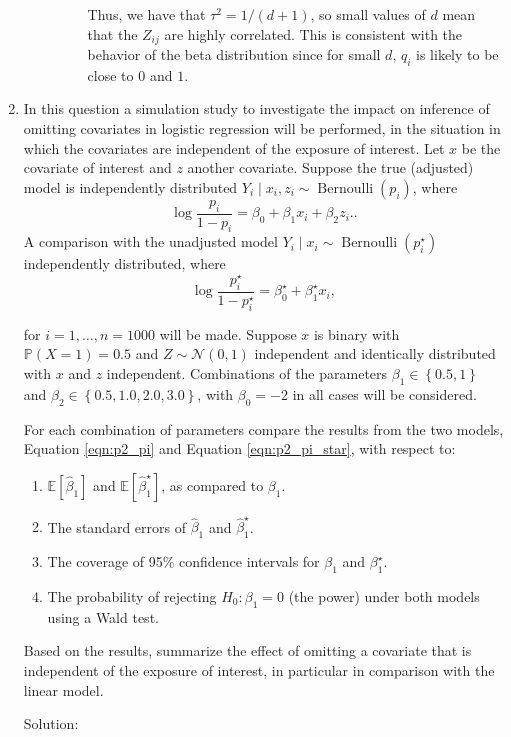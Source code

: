 \documentclass[letterpaper,11pt]{article}
\begin{document}
\begin{enumerate}
\begin{enumerate}
\begin{description}
      Thus, we have that $\tau^2 = 1/\left(d + 1\right)$, so small values of $d$
      mean that the $Z_{ij}$ are highly correlated. This is consistent with the
      behavior of the beta distribution since for small $d$, $q_i$ is likely to
      be close to $0$ and $1$.
    \end{description}
\end{enumerate}
\item In this question a simulation study to investigate the impact on inference
  of omitting covariates in logistic regression will be performed, in the
  situation in which the covariates are independent of the exposure of
  interest. Let $x$ be the covariate of interest and $z$ another
  covariate. Suppose the true (adjusted) model is independently distributed
  $Y_i \mid x_i,z_i \sim \operatorname{Bernoulli}\left(p_i\right)$, where
  \begin{equation}
    \log\frac{p_i}{1 - p_i} = \beta_0 + \beta_1x_i + \beta_2z_i.
    \label{eqn:p2_pi}.
  \end{equation}
  A comparison with the unadjusted model
  $Y_i \mid x_i \sim \operatorname{Bernoulli}\left(p_i^\star\right)$
  independently distributed, where
  \begin{equation}
    \log\frac{p_i^\star}{1 - p_i^\star} = \beta_0^\star + \beta_1^\star x_i,
    \label{eqn:p2_pi_star}
  \end{equation}

  for $i = 1,\ldots,n=1000$ will be made. Suppose $x$ is binary with
  $\mathbb{P}\left(X = 1\right) = 0.5$ and $Z \sim \mathcal{N}\left(0, 1\right)$
  independent and identically distributed with $x$ and $z$
  independent. Combinations of the parameters
  $\beta_1 \in \left\{ 0.5, 1 \right\}$ and
  $\beta_2 \in \left\{0.5,1.0,2.0,3.0\right\}$, with $\beta_0 = -2$ in all cases
  will be considered.

  For each combination of parameters compare the results from the two models,
  Equation \ref{eqn:p2_pi} and Equation \ref{eqn:p2_pi_star}, with respect to:
  \begin{enumerate}
  \item $\mathbb{E}\left[\hat{\beta}_1\right]$ and
    $\mathbb{E}\left[\hat{\beta}_1^\star\right]$, as compared to $\beta_1$.
  \item The standard errors of $\hat{\beta}_1$ and $\hat{\beta}_1^\star$.
  \item The coverage of 95\% confidence intervals for $\beta_1$ and
    $\beta_1^\star$.
  \item The probability of rejecting $H_0 : \beta_1 = 0$ (the power) under both
    models using a Wald test.
  \end{enumerate}

  Based on the results, summarize the effect of omitting a covariate that is
  independent of the exposure of interest, in particular in comparison with the
  linear model.

  \begin{description}
  \item[Solution:] 
  \end{description}
\end{enumerate}
\end{document}
